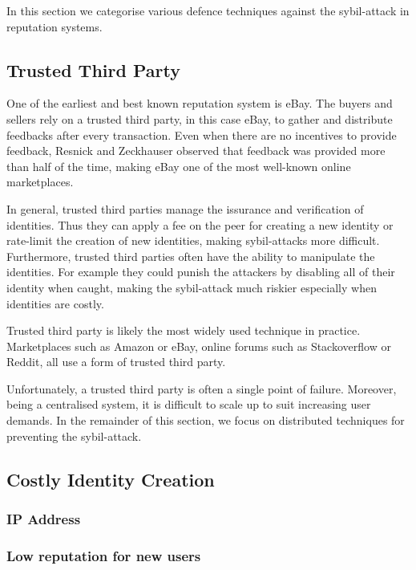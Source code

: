In this section we categorise various defence techniques against the
sybil-attack in reputation systems.

\subsection{Trusted Third Party}\label{sec:trusted_party}
One of the earliest and best known reputation system is
eBay\cite{resnick2002trust}. The buyers and sellers rely on a trusted third
party, in this case eBay, to gather and distribute feedbacks after every
transaction. Even when there are no incentives to provide feedback, Resnick and
Zeckhauser observed that feedback was provided more than half of the
time\cite{resnick2002trust}, making eBay one of the most well-known online
marketplaces.

In general, trusted third parties manage the issurance and verification of
identities. Thus they can apply a fee on the peer for creating a new
identity\cite{resnick2001social} or rate-limit the creation of new
identities\cite{douceur2002sybil}, making sybil-attacks more difficult.
Furthermore, trusted third parties often have the ability to manipulate the
identities. For example they could punish the attackers by disabling all of
their identity when caught, making the sybil-attack much riskier especially when
identities are costly.

Trusted third party is likely the most widely used technique in practice.
Marketplaces such as Amazon or eBay, online forums such as Stackoverflow or
Reddit, all use a form of trusted third party.

Unfortunately, a trusted third party is often a single point of failure.
Moreover, being a centralised system, it is difficult to scale up to suit
increasing user demands. %
In the remainder of this section, we focus on distributed techniques for
preventing the sybil-attack.

\subsection{Costly Identity Creation}\label{sec:costly_id}
\subsubsection{IP Address}
\subsubsection{Low reputation for new users}

